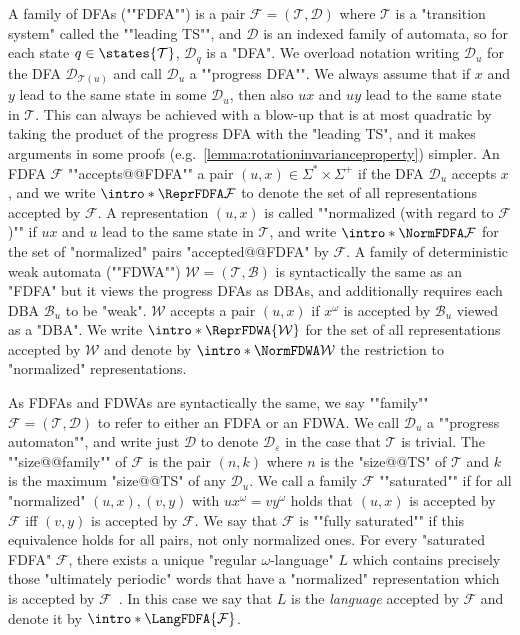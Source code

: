 \documentclass[a4paper,USenglish,cleveref,autoref,thm-restate]{lipics-v2021}
\newcommand{\mc}[1]{\ensuremath{\mathcal{#1}}}
\newcommand{\reprs}[1][\Sigma]{\ensuremath{{#1}^* \times {#1}^+}}
\newcommand{\T}{\mc{T}}
\newcommand{\F}{\mc{F}}
\newcommand{\D}{\mc{D}}
\newcommand{\B}{\mc{B}}
\newcommand{\W}{\mc{W}}
\newcommand{\eps}{\ensuremath{\varepsilon}}
\begin{document}
\AP
A family of DFAs (""FDFA"") is a pair $\F = (\T, \D)$ where $\T$ is a "transition system" called the ""leading TS"", and $\D$ is an indexed family of automata, so for each state $q \in \states{\T}$, $\D_q$ is a "DFA".
We overload notation writing $\D_u$ for the DFA $\D_{\T(u)}$ and call $\D_u$ a ""progress DFA"".
We always assume that if $x$ and $y$ lead to the same state in some $\D_u$, then also $ux$ and $uy$ lead to the same state in $\T$.
This can always be achieved with a blow-up that is at most quadratic by taking the product of the progress DFA with the "leading TS", and it makes arguments in some proofs (e.g.~\cref{lemma:rotationinvarianceproperty}) simpler.
\AP
An FDFA $\F$ ""accepts@@FDFA"" a pair $(u, x) \in \reprs$ if the DFA $\D_u$ accepts $x$, and we write $\intro*\ReprFDFA\F$ to denote the set of all representations accepted by $\F$.
\AP
A representation $(u,x)$ is called ""normalized (with regard to $\F$)"" if $ux$ and $u$ lead to the same state in $\T$, and write $\intro*\NormFDFA\F$ for the set of "normalized" pairs "accepted@@FDFA" by $\F$.
\AP
A family of deterministic weak automata (""FDWA"") $\W = (\T, \B)$ is syntactically the same as an "FDFA" but it views the progress DFAs as DBAs, and additionally requires each DBA $\B_u$ to be "weak".
$\W$ accepts a pair $(u,x)$ if $x^\omega$ is accepted by $\B_u$ viewed as a "DBA".
We write $\intro*\ReprFDWA{\W}$ for the set of all representations accepted by $\W$ and denote by $\intro*\NormFDWA\W$ the restriction to "normalized" representations.

\AP
As FDFAs and FDWAs are syntactically the same, we say ""family"" $\F = (\T, \D)$ to refer to either an FDFA or an FDWA.
We call $\D_u$ a ""progress automaton"", and write just $\D$ to denote $\D_\eps$ in the case that $\T$ is trivial.
\AP
The ""size@@family"" of $\F$ is the pair $(n,k)$ where $n$ is the "size@@TS" of $\T$ and $k$ is the maximum "size@@TS" of any $\D_u$.
\AP
We call a family $\F$ ""saturated"" if for all "normalized" $(u,x),(v,y)$ with $ux^\omega = vy^\omega$ holds that $(u,x)$ is accepted by $\F$ iff $(v,y)$ is accepted by $\F$.
\AP 
We say that $\F$ is ""fully saturated"" if this equivalence holds for all pairs, not only normalized ones.
For every "saturated FDFA" $\F$, there exists a unique "regular $\omega$-language" $L$ which contains precisely those "ultimately periodic" words that have a "normalized" representation which is accepted by $\F$~\cite[Theorem~5.7]{AngluinBF18}.
In this case we say that $L$ is the \emph{language} accepted by $\F$ and denote it by $\intro*\LangFDFA{\F}$.
\end{document}
